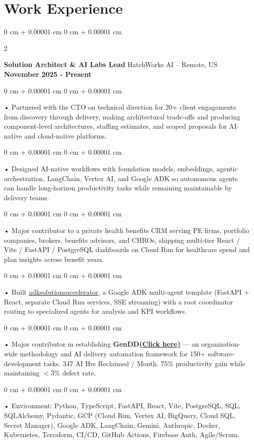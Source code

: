 \documentclass[10pt, letterpaper]{article}
\newenvironment{onecolentry}{
    \begin{adjustwidth}{
        0 cm + 0.00001 cm
    }{
        0 cm + 0.00001 cm
    }
}{
    \end{adjustwidth}
} %
\newenvironment{twocolentry}[2][]{
    \onecolentry
    \def\secondColumn{#2}
    \setcolumnwidth{\fill, 4.5 cm}
    \begin{paracol}{2}
}{
    \switchcolumn \raggedleft \secondColumn
    \end{paracol}
    \endonecolentry
} %
\begin{document}
    \vspace{0.5cm}
    \section{Work Experience}
        \vspace{0.1cm}

        \begin{twocolentry}{
            \textbf{November 2025 - Present}
        }
            \textbf{Solution Architect \& AI Labs Lead} HatchWorks AI -- Remote, US\end{twocolentry}

        \begin{onecolentry}
             • Partnered with the CTO on technical direction for 20+ client engagements from discovery through delivery, making architectural trade-offs and producing component-level architectures, staffing estimates, and scoped proposals for AI-native and cloud-native platforms.
        \end{onecolentry}
        \begin{onecolentry}
             • Designed AI-native workflows with foundation models, embeddings, agentic orchestration, LangChain, Vertex AI, and Google ADK so autonomous agents can handle long-horizon productivity tasks while remaining maintainable by delivery teams.
        \end{onecolentry}
        \begin{onecolentry}
             • Major contributor to a private health benefits CRM serving PE firms, portfolio companies, brokers, benefits advisors, and CHROs, shipping multi-tier React / Vite / FastAPI / PostgreSQL dashboards on Cloud Run for healthcare spend and plan insights across benefit years.
        \end{onecolentry}
        \begin{onecolentry}
             • Built \href{https://github.com/sreenikethaathreya-hw/adksolutionsaccelerator}{adksolutionsaccelerator}, a Google ADK multi-agent template (FastAPI + React, separate Cloud Run services, SSE streaming) with a root coordinator routing to specialized agents for analysis and KPI workflows.
        \end{onecolentry}
        \begin{onecolentry}
             • Major contributor in establishing \textbf{GenDD}\href{https://hatchworks.com/generative-driven-development/}{\textbf{(Click here)}} --- an organization-wide methodology and AI delivery automation framework for 150+ software-development tasks. 347 AI Hrs Reclaimed / Month. 75\% productivity gain while maintaining $<$3\% defect rate.
        \end{onecolentry}
        \begin{onecolentry}
             • Environment: Python, TypeScript, FastAPI, React, Vite, PostgreSQL, SQL, SQLAlchemy, Pydantic, GCP (Cloud Run, Vertex AI, BigQuery, Cloud SQL, Secret Manager), Google ADK, LangChain, Gemini, Anthropic, Docker, Kubernetes, Terraform, CI/CD, GitHub Actions, Firebase Auth, Agile/Scrum.
        \end{onecolentry}
\end{document}
